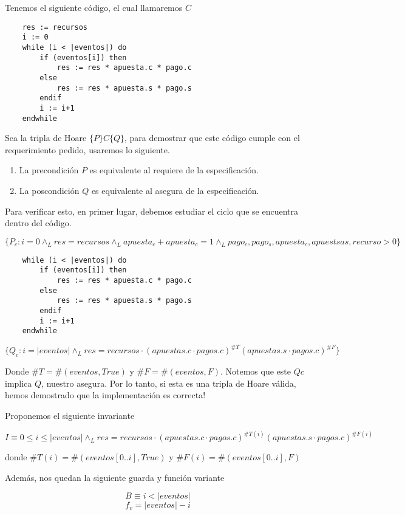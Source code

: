 \documentclass[../document.tex]{subfiles}
\begin{document}
Tenemos el siguiente código, el cual llamaremos $C$
\begin{verbatim}
    res := recursos
    i := 0
    while (i < |eventos|) do
        if (eventos[i]) then
            res := res * apuesta.c * pago.c
        else
            res := res * apuesta.s * pago.s
        endif
        i := i+1
    endwhile
\end{verbatim}

Sea la tripla de Hoare $\{P\}C\{Q\}$, para demostrar que este código cumple con el requerimiento pedido, usaremos lo siguiente.

\begin{enumerate}
    \item La precondición $P$ es equivalente al requiere de la especificación.
    \item La poscondición $Q$ es equivalente al asegura de la especificación.
\end{enumerate}

Para verificar esto, en primer lugar, debemos estudiar el ciclo que se encuentra dentro del código.

$\{P_c: i = 0 \land_{L} res = recursos \land_{L} apuesta_{c}+apuesta_{c}=1 \land_{L} pago_{c},pago_{s},apuesta_{c},apuestsa{s},recurso>0\}$

\begin{verbatim}
    while (i < |eventos|) do
        if (eventos[i]) then
            res := res * apuesta.c * pago.c
        else
            res := res * apuesta.s * pago.s
        endif
        i := i+1
    endwhile
\end{verbatim}

$\{Q_c: i = |eventos| \land_{L} res = recursos \cdot (apuestas.c\cdot pagos.c)^{\#T}(apuestas.s\cdot pagos.c)^{\#F}\}$

Donde $\#T = \#(eventos, True)$ y $\#F = \#(eventos, F)$. Notemos que este $Qc$ implica $Q$, nuestro asegura. Por lo tanto, si esta es una tripla de Hoare válida, hemos demostrado que la implementación es correcta!

Proponemos el siguiente invariante

$$I \equiv 0\leq i \leq |eventos| \land_L res = recursos \cdot (apuestas.c\cdot pagos.c)^{\#T(i)}(apuestas.s\cdot pagos.c)^{\#F(i)}$$

donde $\#T(i) = \#(eventos[0..i], True)$ y $\#F(i) = \#(eventos[0..i], F)$

Además, nos quedan la siguiente guarda y función variante

$$B \equiv i < |eventos|$$
$$f_v = |eventos|-i$$
\end{document}
